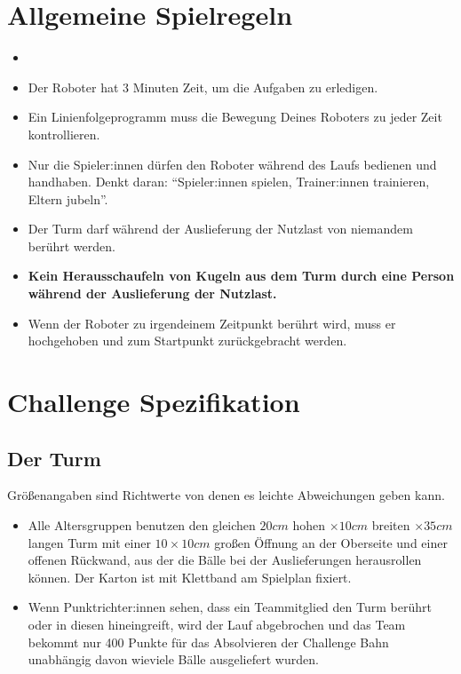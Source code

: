 \documentclass[a4paper,12pt]{article}
\begin{document}
\section{Allgemeine Spielregeln}
\begin{itemize}
	\item \scoreRuns
	\item Der Roboter hat 3 Minuten Zeit, um die Aufgaben zu erledigen.
	\item Ein Linienfolgeprogramm muss die Bewegung Deines Roboters zu
		jeder Zeit kontrollieren.
	\item Nur die Spieler:innen dürfen den Roboter während des Laufs
		bedienen und handhaben. Denkt daran: ``Spieler:innen spielen,
		Trainer:innen trainieren, Eltern jubeln''.
	\item Der Turm darf während der Auslieferung der Nutzlast von niemandem
		berührt werden.
	\item \textbf{Kein Herausschaufeln von Kugeln aus dem Turm durch eine
		Person während der Auslieferung der Nutzlast.}
	\item Wenn der Roboter zu irgendeinem Zeitpunkt berührt wird, muss er
		hochgehoben und zum Startpunkt zurückgebracht werden.
\end{itemize}

\section{Challenge Spezifikation}
\subsection{Der Turm}
Größenangaben sind Richtwerte von denen es leichte Abweichungen geben kann.
\begin{itemize}
	\item Alle Altersgruppen benutzen den gleichen $20 cm$ hohen
		$\times 10 cm$ breiten $\times 35 cm$ langen Turm mit einer
		$10\times10 cm$ großen Öffnung an der Oberseite und einer
		offenen Rückwand, aus der die Bälle bei der Auslieferungen
		herausrollen können. Der Karton ist mit Klettband am Spielplan
		fixiert.
	\item Wenn Punktrichter:innen sehen, dass ein Teammitglied den Turm
		berührt oder in diesen hineingreift, wird der Lauf abgebrochen
		und das Team bekommt nur 400 Punkte für das Absolvieren der
		Challenge Bahn unabhängig davon wieviele Bälle ausgeliefert
		wurden.
\end{itemize}
\end{document}
